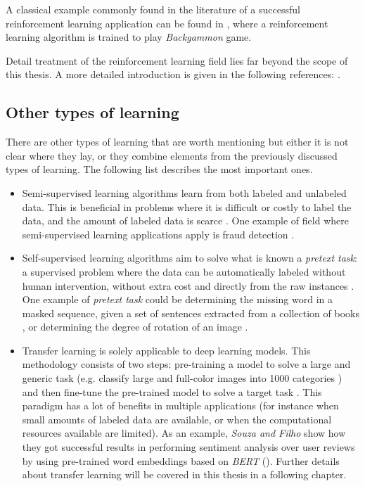 A classical example commonly found in the literature of a successful reinforcement learning application can be found in \cite{tesauro1994}, where a reinforcement learning algorithm is trained to play \textit{Backgammon} game.

Detail treatment of the reinforcement learning field lies far beyond the scope of this thesis. A more detailed introduction is given in the following references: \cite{sutton2018, szepesvari2010}.

\subsection{Other types of learning}
There are other types of learning \cite{raghu2020} that are worth mentioning but either it is not clear where they lay, or they combine elements from the previously discussed types of learning. The following list describes the most important ones.
\begin{itemize}
	\item Semi-supervised learning algorithms learn from both labeled and unlabeled data. This is beneficial in problems where it is difficult or costly to label the data, and the amount of labeled data is scarce \cite{raghu2020}. One example of field where semi-supervised learning applications apply is fraud detection \cite{wang2020}.
	\item Self-supervised learning algorithms aim to solve what is known a \textit{pretext task}: a supervised problem where the data can be automatically labeled without human intervention, without extra cost and directly from the raw instances \cite{raghu2020}. One example of \textit{pretext task} could be determining the missing word in a masked sequence, given a set of sentences extracted from a collection of books \cite{devlin2019}, or determining the degree of rotation of an image \cite{gidaris2018}.
	\item Transfer learning is solely applicable to deep learning models. This methodology consists of two steps: pre-training a model to solve a large and generic task (e.g. classify large and full-color images into 1000 categories \cite{deng2009imagenet}) and then fine-tune the pre-trained model to solve a target task \cite{raghu2020}. This paradigm has a lot of benefits in multiple applications (for instance when small amounts of labeled data are available, or when the computational resources available are limited). As an example, \textit{Souza and Filho} \cite{souza2022} show how they got successful results in performing sentiment analysis over user reviews by using pre-trained word embeddings based on \textit{BERT} (\cite{devlin2019}). Further details about transfer learning will be covered in this thesis in a following chapter.
\end{itemize}


